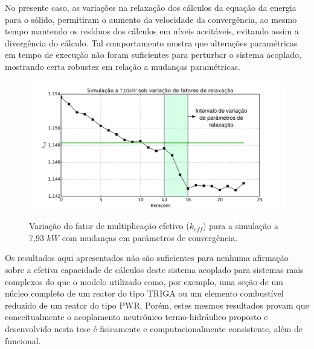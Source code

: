 No presente caso, as variações na relaxação dos cálculos da equação da energia para
o sólido, permitiram o aumento da velocidade da convergência, ao mesmo tempo mantendo
os resíduos dos cálculos em níveis aceitáveis, evitando assim a divergência do cálculo.
Tal comportamento mostra que alterações paramétricas em tempo de execução não foram
suficientes para perturbar o sistema acoplado, mostrando certa robustez em relação
a mudanças paramétricas.

\begin{figure}[htb]
  \caption[Variação do fator de multiplicação sobe variação de parâmetros de convergência.]{Variação do fator de multiplicação efetivo ($k_{eff}$) para a simulação a 7,93 $kW$ com mudanças em parâmetros de convergência.}
  \centering\includegraphics[scale=0.5]{figuras/plot200-disturb-port.png}
  \label{fig:keff_dist}
\end{figure}


Os resultados aqui apresentados não são suficientes para nenhuma afirmação sobre a
efetiva capacidade de cálculos deste sistema acoplado para sistemas mais complexos
do que o modelo utilizado como, por exemplo, uma seção de um núcleo completo de um
reator do tipo TRIGA ou um elemento combustível reduzido de um reator do tipo PWR.
Porém, estes mesmos resultados provam que conceitualmente o acoplamento neutrônico
termo-hidráulico proposto e desenvolvido nesta tese é fisicamente e computacionalmente
consistente, além de funcional.

